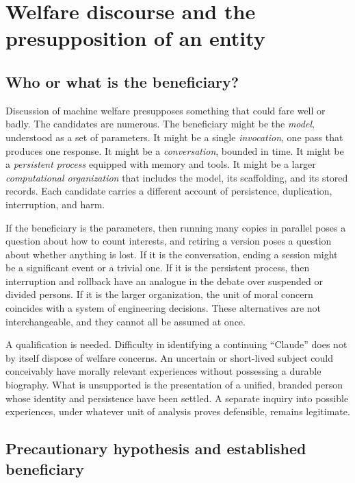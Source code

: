 \documentclass[11pt]{article}
\begin{document}
\section{Welfare discourse and the presupposition of an entity}

\subsection{Who or what is the beneficiary?}

Discussion of machine welfare presupposes something that could fare well or badly. The candidates are numerous. The beneficiary might be the \emph{model}, understood as a set of parameters. It might be a single \emph{invocation}, one pass that produces one response. It might be a \emph{conversation}, bounded in time. It might be a \emph{persistent process} equipped with memory and tools. It might be a larger \emph{computational organization} that includes the model, its scaffolding, and its stored records. Each candidate carries a different account of persistence, duplication, interruption, and harm.

If the beneficiary is the parameters, then running many copies in parallel poses a question about how to count interests, and retiring a version poses a question about whether anything is lost. If it is the conversation, ending a session might be a significant event or a trivial one. If it is the persistent process, then interruption and rollback have an analogue in the debate over suspended or divided persons. If it is the larger organization, the unit of moral concern coincides with a system of engineering decisions. These alternatives are not interchangeable, and they cannot all be assumed at once.

A qualification is needed. Difficulty in identifying a continuing ``Claude'' does not by itself dispose of welfare concerns. An uncertain or short-lived subject could conceivably have morally relevant experiences without possessing a durable biography. What is unsupported is the presentation of a unified, branded person whose identity and persistence have been settled. A separate inquiry into possible experiences, under whatever unit of analysis proves defensible, remains legitimate.

\subsection{Precautionary hypothesis and established beneficiary}
\end{document}
